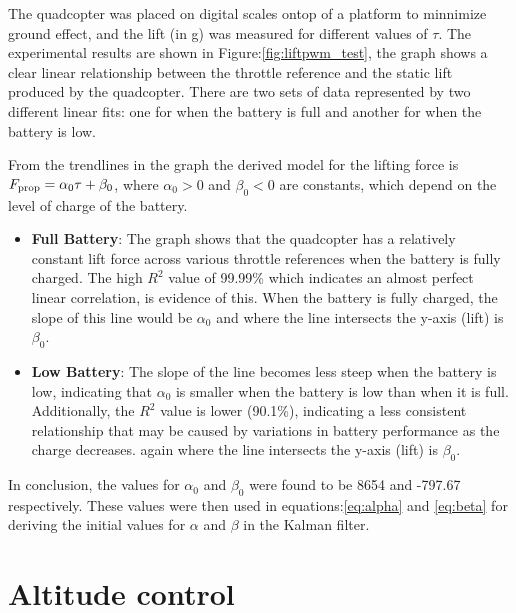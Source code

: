 \documentclass{report}
\begin{document}
The quadcopter was placed on digital scales ontop of a platform to minnimize
ground effect, and the lift (in g) was measured for different values of
\(\tau\). The experimental results are shown in Figure:\ref{fig:liftpwm_test},
the graph shows a clear linear relationship between the throttle reference and
the static lift produced by the quadcopter. There are two sets of data
represented by two different linear fits: one for when the battery is full and
another for when the battery is low.

From the trendlines in the graph the derived model for the lifting force is
\(F_{\rm prop} = \alpha_0 \tau + \beta_0\), where $\alpha_0>0$ and $\beta_0<0$
are constants, which depend on the level of charge of the battery.

\begin{itemize}
  \item \textbf{Full Battery}: The graph shows that the quadcopter has a
    relatively constant lift force across various throttle references when the
    battery is fully charged. The high \(R^2\) value of 99.99\% which indicates
    an almost perfect linear correlation, is evidence of this. When the battery
    is fully charged, the slope of this line would be \(\alpha_0\) and where the
    line intersects the y-axis (lift) is \(\beta_0\).
  \item \textbf{Low Battery}: The slope of the line becomes less steep when the
    battery is low, indicating that \(\alpha_0\) is smaller when the battery is
    low than when it is full. Additionally, the \(R^2\) value is lower (90.1\%),
    indicating a less consistent relationship that may be caused by variations
    in battery performance as the charge decreases. again where the line
    intersects the y-axis (lift) is \(\beta_0\).
\end{itemize}
In conclusion, the values for \(\alpha_0\) and \(\beta_0\) were found to be 8654
and -797.67 respectively. These values were then used in
equations:\ref{eq:alpha} and \ref{eq:beta} for deriving the initial values for
\(\alpha\) and \(\beta\) in the Kalman filter.

\section{Altitude control}\label{altitude_cotrol_tests}
\end{document}
